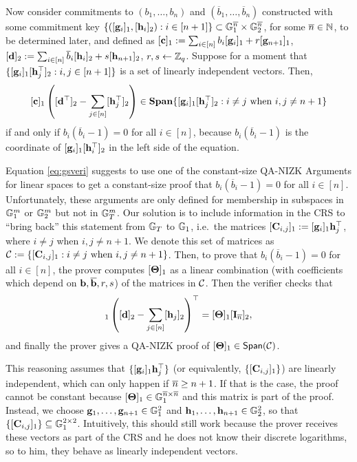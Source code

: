 Now consider commitments to $(b_1,\ldots,b_n)$ and $(\overline{b}_1,\ldots,\overline{b}_n)$ constructed with some commitment key $\{([\mathbf{g}_i]_1,[\mathbf{h}_i]_2): i \in [n+1]\}\subset\mathbb{G}_1^{{\overline{n}}}\times\mathbb{G}_2^{\overline{n}}$, for some ${\overline{n}}\in\mathbb{N}$, to be determined later, and defined as $[\mathbf{c}]_1:=\sum_{i \in [n]} b_i [\mathbf{g}_i]_1 + r [\mathbf{g}_{n+1}]_1$, 
$[\mathbf{d}]_2:=\sum_{i \in [n]} \overline{b}_i [\mathbf{h}_i]_2 + s [{\mathbf{h}}_{n+1}]_2$, $r,s \gets \mathbb{Z}_q$. Suppose for a moment that 
$\{ [\mathbf{g}_{i}]_1 [\mathbf{h}_{j}^\top]_2 : i,j \in [n+1]\}$ 
is a set of linearly independent vectors. Then,  
\begin{equation} \label{eq:gsveri}
[\mathbf{c}]_1 \left([\mathbf{d}^\top]_2-
\sum_{j\in[n]} [\mathbf{h}_j^\top]_2\right) \in \mathbf{Span}\{ [\mathbf{g}_i]_1[\mathbf{h}_j^\top]_2: i\neq j\text{ when } i,j\neq n+1 \} 
\end{equation}
if and only if $b_i(\overline{b}_i-1)=0$ for all $i \in [n]$,
because $b_i(\overline{b}_i-1)$ is the coordinate of 
$[\mathbf{g}_i]_1[\mathbf{h}_i^\top]_2$ in the left side of the equation.


Equation \ref{eq:gsveri} suggests to use one of the constant-size QA-NIZK Arguments for linear spaces to get a constant-size proof that $b_i(\overline{b}_i-1)=0$ for all $i \in [n]$. Unfortunately, these arguments are only defined for membership in subspaces  in 
$\mathbb{G}_1^m$ or $\mathbb{G}_2^m$ but not in $\mathbb{G}_T^m$. Our solution is to include information in the CRS to ``bring back'' 
  this statement from $\mathbb{G}_T$ to $\mathbb{G}_1$, i.e.\ 
  the matrices   $[\mathbf{{C}}_{i,j}]_1:=[\mathbf{g}_i]_1\mathbf{h}_j^{\top}$, where $i\neq j$ when $i,j\neq n+1$. We denote this set of matrices as
 $\mathcal{C}:=\{[\mathbf{{C}}_{i,j}]_1: i\neq j\text{ when } i,j\neq n+1\}$.   
Then, to prove that $b_i(\overline{b}_i-1)=0$ for all $i\in [n]$, the prover computes 
$[\mathbf{{\Theta}}]_1$ as a linear combination (with coefficients which depend on
 $\mathbf{b},\mathbf{\overline{b}},r,s$) of the matrices in $\mathcal{C}$.
Then the verifier checks that
\begin{equation}
[\vecb{c}]_1\left([\vecb{d}]_2-
\sum_{j\in[n]}[\lrck_j]_2\right)^{\top}=
[\matr{\Theta}]_1[\matr{I}_{\nb}]_2,
\end{equation}
 and finally the prover gives a QA-NIZK proof of  $[\mathbf{{\Theta}}]_1 \in \mathsf{Span}(\mathcal{C})$.

This reasoning assumes that $\{[\mathbf{g}_i]_1 \mathbf{h}_j^{\top}\}$ (or equivalently, $\{[\mathbf{{C}}_{i,j}]_1\}$) are linearly independent,  which can only happen if 
${\overline{n}} \geq n+1$. If that is the case, the proof cannot be constant because $[\mathbf{{\Theta}}]_1 \in \mathbb{G}_1^{{\overline{n}}\times{\overline{n}}}$ and this matrix is part of the proof.
Instead, we choose $\mathbf{g}_1,\ldots,\mathbf{g}_{n+1} \in \mathbb{G}_1^{2}$ and $\mathbf{h}_1,\ldots,\mathbf{h}_{n+1} \in \mathbb{G}_2^{2}$, so that 
$\{[\mathbf{{C}}_{i,j}]_1\} \subseteq \mathbb{G}_1^{2 \times 2}$.  Intuitively, this should still work because the prover receives these vectors as part of the CRS and he does not know their discrete logarithms, so to him, they behave as linearly independent vectors.  


